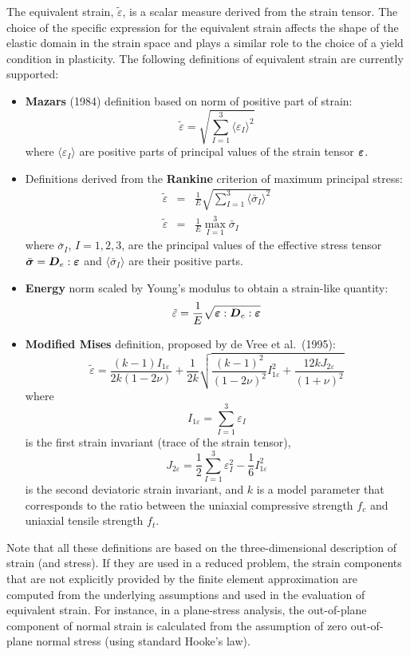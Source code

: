 \documentclass[a4paper]{article}
\newcommand{\mbf}[1]{\mbox{\boldmath$#1$}}
\newcommand{\del}[2]{\mbox{$\displaystyle\frac{#1}{#2}$}}
\begin{document}
The equivalent strain, $\tilde\varepsilon$, is a scalar measure derived from the
strain tensor. The choice of the specific expression
for the equivalent strain affects the shape of the elastic domain
in the strain space and plays a similar role to the choice of a yield
condition in plasticity.
The following definitions of equivalent strain are currently supported:
\begin{itemize}
\item
{\bf Mazars} (1984) definition based on norm of positive part of strain:
\begin{equation}
\label{mazars}
\tilde\varepsilon=\sqrt{\displaystyle{\sum_{I=1}^{3}}\langle\varepsilon_I\rangle^2}
\end{equation}
where $\langle\varepsilon_I\rangle$ are positive parts of 
principal values of the strain tensor $\mbf{\varepsilon}$.
\item
Definitions derived from the {\bf Rankine} criterion of maximum principal stress:
\begin{eqnarray}
\label{rankinesmooth}
\tilde\varepsilon&=&
{\del{1}{E}}\sqrt{\displaystyle{\sum_{I=1}^{3}}\langle\bar{\sigma}_I\rangle^2}
\\
\label{rankinestandard}
\tilde\varepsilon&=&
{\del{1}{E}}\max_{I=1}^{3}\bar{\sigma}_I
\end{eqnarray}
where
$\bar{\sigma}_I$, $I=1,2,3$, are the principal 
values of the
effective stress tensor $\bar{\mbf{\sigma}} = \mbf{D}_e:\mbf{\varepsilon}$
and $\langle\bar{\sigma}_I\rangle$ are their positive parts.
\item
{\bf Energy} norm scaled by Young's modulus to obtain
a strain-like quantity:
\begin{equation}
\label{energynorm}
\tilde\varepsilon=\del{1}{E}\sqrt{{\mbf{\varepsilon}:\mbf{D}_e:\mbf{\varepsilon}}}
\end{equation}
\item
{\bf Modified Mises} definition, proposed by de Vree et al.~(1995):
\begin{equation}
\label{modifiedmises}
\tilde\varepsilon=\frac{(k-1)I_{1\varepsilon}}{2k(1-2\nu)} + \frac{1}{2k}\sqrt{\frac{(k-1)^2}{(1-2\nu)^2}I_{1\varepsilon}^2+\frac{12 k J_{2\varepsilon}}{(1+\nu)^2}} 
\end{equation}
where $$
I_{1\varepsilon} = \sum_{I=1}^3\varepsilon_I
$$
is the first strain invariant (trace of the strain tensor),
$$
J_{2\varepsilon} = \frac{1}{2}\sum_{I=1}^3 \varepsilon_I^2-\frac{1}{6}I_{1\varepsilon}^2
$$  
is the second deviatoric strain invariant,
and $k$ is a model parameter that corresponds to the ratio between the uniaxial
compressive strength $f_c$ and uniaxial tensile strength $f_t$.
\end{itemize}
Note that all these definitions are based on the three-dimensional
description of strain (and stress). If they are used in a reduced
problem, the strain components that are not explicitly provided by
the finite element approximation are computed from the underlying 
assumptions and used in the evaluation of equivalent strain.
For instance, in a plane-stress analysis, the out-of-plane component
of normal strain is calculated from the assumption of zero
out-of-plane normal stress (using standard Hooke's law).
\end{document}

